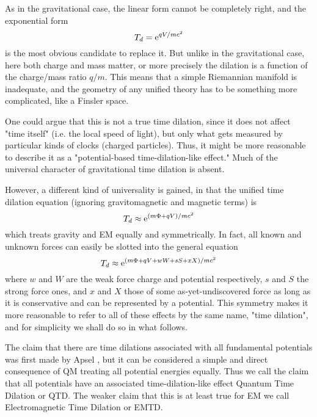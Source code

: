 As in the gravitational case,
the linear form cannot be completely right, and
the exponential form 
\begin{equation}
T_d = {\rm e}^{qV/mc^2}
\end{equation}
is the most obvious candidate to replace it.
But unlike in the gravitational case, here both charge and mass matter,
or more precisely the dilation is a function of the charge/mass ratio $q/m$.
This means that a simple Riemannian manifold is inadequate,
and the geometry of any unified theory has to be something more complicated,
like a Finsler space. \cite{Beil1987}

One could argue that this is not a true time dilation,
since it does not affect "time itself" (i.e. the local speed of light),
but only what gets measured by particular kinds of clocks (charged particles).
Thus, it might be more reasonable to describe it as a "potential-based time-dilation-like effect."
Much of the universal character of gravitational time dilation is absent.

However, a different kind of universality is gained,
in that the unified time dilation equation
(ignoring gravitomagnetic and magnetic terms) is
\begin{equation}\label{emtd}
T_d \approx  {\rm e}^{(m\Phi + qV) / mc^2}
\end{equation}
which treats gravity and EM equally and symmetrically.
In fact, all known and unknown forces can easily be slotted into the general equation
\begin{equation}\label{qtd}
T_d \approx  {\rm e}^{(m\Phi + qV + wW + sS + xX) / mc^2}
\end{equation}
where $w$ and $W$ are the weak force charge and potential respectively,
$s$ and $S$ the strong force ones,
and $x$ and $X$ those of some as-yet-undiscovered force
as long as it is conservative and can be represented by a potential.
This symmetry makes it more reasonable to refer to all of these effects by the same name,
"time dilation", and for simplicity we shall do so in what follows.

The claim that there are time dilations associated with all fundamental potentials
was first made by Apsel \cite{Apsel1978,Apsel1979},
but it can be considered a simple and direct consequence of QM treating all potential energies equally.
Thus we call the claim that all potentials have an associated time-dilation-like effect Quantum Time Dilation or QTD.
The weaker claim that this is at least true for EM we call Electromagnetic Time Dilation or EMTD.


